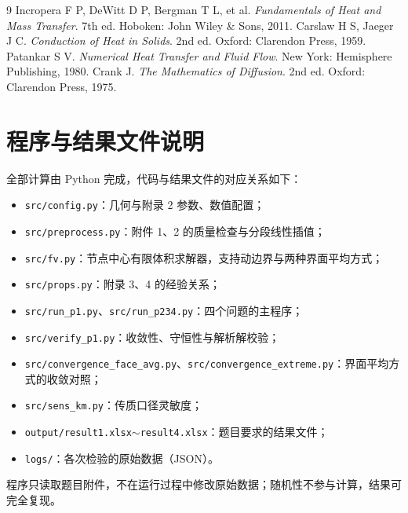 \documentclass[12pt,a4paper]{ctexart}
\begin{document}
\begin{thebibliography}{9}
 Incropera F P, DeWitt D P, Bergman T L, et al. \emph{Fundamentals of Heat and Mass Transfer}. 7th ed. Hoboken: John Wiley \& Sons, 2011.
 Carslaw H S, Jaeger J C. \emph{Conduction of Heat in Solids}. 2nd ed. Oxford: Clarendon Press, 1959.
 Patankar S V. \emph{Numerical Heat Transfer and Fluid Flow}. New York: Hemisphere Publishing, 1980.
 Crank J. \emph{The Mathematics of Diffusion}. 2nd ed. Oxford: Clarendon Press, 1975.
\end{thebibliography}

\appendix
\section{程序与结果文件说明}

全部计算由 Python 完成，代码与结果文件的对应关系如下：

\begin{itemize}
\item \texttt{src/config.py}：几何与附录 2 参数、数值配置；
\item \texttt{src/preprocess.py}：附件 1、2 的质量检查与分段线性插值；
\item \texttt{src/fv.py}：节点中心有限体积求解器，支持动边界与两种界面平均方式；
\item \texttt{src/props.py}：附录 3、4 的经验关系；
\item \texttt{src/run\_p1.py}、\texttt{src/run\_p234.py}：四个问题的主程序；
\item \texttt{src/verify\_p1.py}：收敛性、守恒性与解析解校验；
\item \texttt{src/convergence\_face\_avg.py}、\texttt{src/convergence\_extreme.py}：界面平均方式的收敛对照；
\item \texttt{src/sens\_km.py}：传质口径灵敏度；
\item \texttt{output/result1.xlsx}$\sim$\texttt{result4.xlsx}：题目要求的结果文件；
\item \texttt{logs/}：各次检验的原始数据（JSON）。
\end{itemize}

程序只读取题目附件，不在运行过程中修改原始数据；随机性不参与计算，结果可完全复现。
\end{document}

